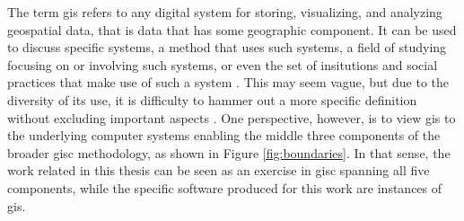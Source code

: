 \documentclass[notitlepage]{article}
\begin{document}
The term \ac{gis} refers to any digital system for storing, visualizing, and analyzing geospatial data, that is data that has some geographic component. It can be used to discuss specific systems, a method that uses such systems, a field of studying focusing on or involving such systems, or even the set of insitutions and social practices that make use of such a system \cite{sheppardGISSocietyResearch1995}. This may seem vague, but due to the diversity of its use, it is difficulty to hammer out a more specific definition without excluding important aspects \cite{goodchildOverviewDefinitionGIS1992, picklesToolScienceGIS1997, chrismanWhatDoesGIS1999, heikkilaGISDeadLong1998}. One perspective, however, is to view \ac{gis} to the underlying computer systems enabling the middle three components of the broader \ac{gisc} methodology, as shown in Figure \ref{fig:boundaries}. In that sense, the work related in this thesis can be seen as an exercise in \ac{gisc} spanning all five components, while the specific software produced for this work are instances of \ac{gis}. 

%
%
\end{document}
